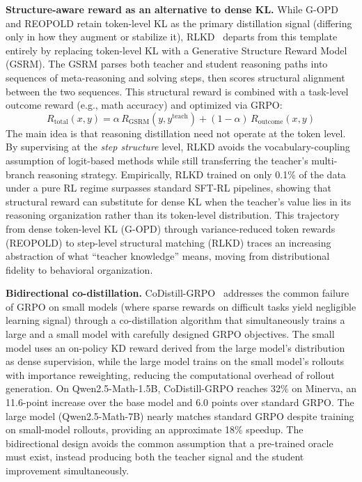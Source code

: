 \documentclass{article} %
\begin{document}
\textbf{Structure-aware reward as an alternative to dense KL.} While G-OPD and REOPOLD retain token-level KL as the primary distillation signal (differing only in how they augment or stabilize it), RLKD~\citep{2505.16142} departs from this template entirely by replacing token-level KL with a Generative Structure Reward Model (GSRM). The GSRM parses both teacher and student reasoning paths into sequences of meta-reasoning and solving steps, then scores structural alignment between the two sequences. This structural reward is combined with a task-level outcome reward (e.g., math accuracy) and optimized via GRPO:
\begin{equation*}
    R_{\text{total}}(x, y) = \alpha \, R_{\text{GSRM}}(y, y^{\text{teach}}) + (1-\alpha) \, R_{\text{outcome}}(x, y)
\end{equation*}
The main idea is that reasoning distillation need not operate at the token level. By supervising at the \emph{step structure} level, RLKD avoids the vocabulary-coupling assumption of logit-based methods while still transferring the teacher's multi-branch reasoning strategy. Empirically, RLKD trained on only 0.1\% of the data under a pure RL regime surpasses standard SFT-RL pipelines, showing that structural reward can substitute for dense KL when the teacher's value lies in its reasoning organization rather than its token-level distribution. This trajectory from dense token-level KL (G-OPD) through variance-reduced token rewards (REOPOLD) to step-level structural matching (RLKD) traces an increasing abstraction of what ``teacher knowledge'' means, moving from distributional fidelity to behavioral organization.

\textbf{Bidirectional co-distillation.} CoDistill-GRPO~\citep{2605.08873} addresses the common failure of GRPO on small models (where sparse rewards on difficult tasks yield negligible learning signal) through a co-distillation algorithm that simultaneously trains a large and a small model with carefully designed GRPO objectives. The small model uses an on-policy KD reward derived from the large model's distribution as dense supervision, while the large model trains on the small model's rollouts with importance reweighting, reducing the computational overhead of rollout generation. On Qwen2.5-Math-1.5B, CoDistill-GRPO reaches 32\% on Minerva, an 11.6-point increase over the base model and 6.0 points over standard GRPO. The large model (Qwen2.5-Math-7B) nearly matches standard GRPO despite training on small-model rollouts, providing an approximate 18\% speedup. The bidirectional design avoids the common assumption that a pre-trained oracle must exist, instead producing both the teacher signal and the student improvement simultaneously.
\end{document}
